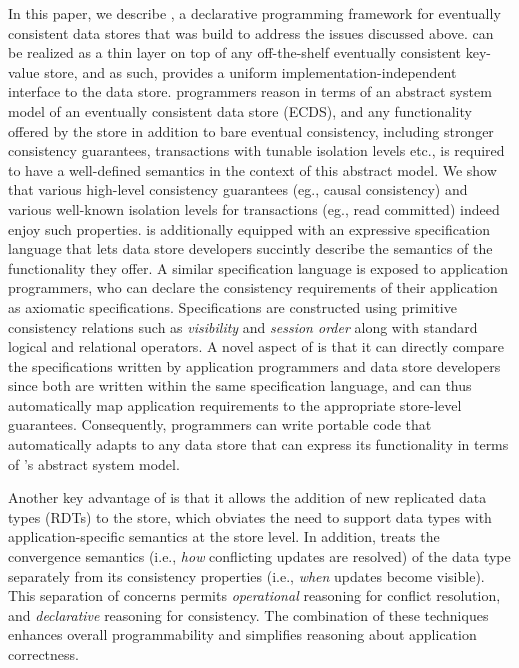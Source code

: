 In this paper, we describe \name, a declarative programming framework
for eventually consistent data stores that was build to address the
issues discussed above. \name can be realized as a thin layer on top
of any off-the-shelf eventually consistent key-value store, and as
such, provides a uniform implementation-independent interface to the
data store. \name programmers reason in terms of an abstract system
model of an eventually consistent data store (ECDS), and any
functionality offered by the store in addition to bare eventual
consistency, including stronger consistency guarantees, transactions
with tunable isolation levels etc., is required to have a well-defined
semantics in the context of this abstract model. We show that various
high-level consistency guarantees (eg., causal consistency) and
various well-known isolation levels for transactions (eg., read
committed) indeed enjoy such properties.  \name is additionally
equipped with an expressive specification language that lets data
store developers succintly describe the semantics of the functionality
they offer. A similar specification language is exposed to application
programmers, who can declare the consistency requirements of their
application as axiomatic specifications. Specifications are
constructed using primitive consistency relations such as
\emph{visibility} and \emph{session order} along with standard logical
and relational operators. A novel aspect of \name is that it can
directly compare the specifications written by application programmers
and data store developers since both are written within the same
specification language, and can thus automatically map application
requirements to the appropriate store-level guarantees. Consequently,
\name programmers can write portable code that automatically adapts to
any data store that can express its functionality in terms of \name's
abstract system model.

Another key advantage of \name is that it allows the addition of new
replicated data types (RDTs) to the store, which obviates the need to
support data types with application-specific semantics at the store
level. In addition, \name treats the convergence semantics (i.e.,
\emph{how} conflicting updates are resolved) of the data type
separately from its consistency properties (i.e., \emph{when} updates
become visible).  This separation of concerns permits
\emph{operational} reasoning for conflict resolution, and
\emph{declarative} reasoning for consistency.  The combination of
these techniques enhances overall programmability and simplifies
reasoning about application correctness.

